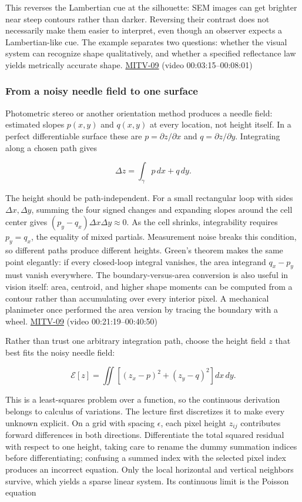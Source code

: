 This reverses the Lambertian cue at the silhouette: SEM images can get brighter near steep contours rather than darker. Reversing their contrast does not necessarily make them easier to interpret, even though an observer expects a Lambertian-like cue. The example separates two questions: whether the visual system can recognize shape qualitatively, and whether a specified reflectance law yields metrically accurate shape. \hyperref[04-visual-computing-ii-ch036]{MITV-09} (video 00:03:15--00:08:01)

\subsubsection{From a noisy needle field to one surface}\label{from-a-noisy-needle-field-to-one-surface}

Photometric stereo or another orientation method produces a needle field: estimated slopes \(p(x,y)\) and \(q(x,y)\) at every location, not height itself. In a perfect differentiable surface these are \(p=\partial z/\partial x\) and \(q=\partial z/\partial y\). Integrating along a chosen path gives

\[
\Delta z=\int_\gamma p\,dx+q\,dy.
\]

The height should be path-independent. For a small rectangular loop with sides \(\Delta x,\Delta y\), summing the four signed changes and expanding slopes around the cell center gives \((p_y-q_x)\Delta x\Delta y\approx0\). As the cell shrinks, integrability requires \(p_y=q_x\), the equality of mixed partials. Measurement noise breaks this condition, so different paths produce different heights. Green's theorem makes the same point elegantly: if every closed-loop integral vanishes, the area integrand \(q_x-p_y\) must vanish everywhere. The boundary-versus-area conversion is also useful in vision itself: area, centroid, and higher shape moments can be computed from a contour rather than accumulating over every interior pixel. A mechanical planimeter once performed the area version by tracing the boundary with a wheel. \hyperref[04-visual-computing-ii-ch036]{MITV-09} (video 00:21:19--00:40:50)

Rather than trust one arbitrary integration path, choose the height field \(z\) that best fits the noisy needle field:

\[
\mathcal E[z]=\iint\left[(z_x-p)^2+(z_y-q)^2\right]dx\,dy.
\]

This is a least-squares problem over a function, so the continuous derivation belongs to calculus of variations. The lecture first discretizes it to make every unknown explicit. On a grid with spacing \(\epsilon\), each pixel height \(z_{ij}\) contributes forward differences in both directions. Differentiate the total squared residual with respect to one height, taking care to rename the dummy summation indices before differentiating; confusing a summed index with the selected pixel index produces an incorrect equation. Only the local horizontal and vertical neighbors survive, which yields a sparse linear system. Its continuous limit is the Poisson equation

